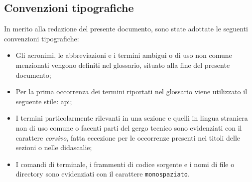 \subsection{Convenzioni tipografiche}
\label{sec:convenzioni-tipografiche}

In merito alla redazione del presente documento, sono state adottate le seguenti convenzioni tipografiche:
\begin{itemize}
	\item Gli acronimi, le abbreviazioni e i termini ambigui o di uso non comune menzionati vengono definiti nel glossario, situato alla fine del presente documento;

	\item Per la prima occorrenza dei termini riportati nel glossario viene utilizzato il seguente stile: \gls{api}\glsfirstoccur;

	\item I termini particolarmente rilevanti in una sezione e quelli in lingua straniera non di uso comune o facenti parti del gergo tecnico sono evidenziati con il carattere \emph{corsivo}, fatta eccezione per le occorrenze presenti nei titoli delle sezioni o nelle didascalie;

	\item I comandi di terminale, i frammenti di codice sorgente e i nomi di file o directory sono evidenziati con il carattere \texttt{monospaziato}.

\end{itemize}
